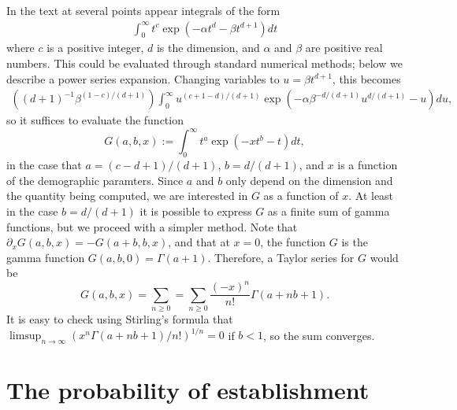 \documentclass{article}
\begin{document}
In the text at several points appear integrals of the form
\begin{align}
  \int_0^\infty t^c \exp \left( - \alpha t^d - \beta t^{d+1} \right) dt 
\end{align}
where $c$ is a positive integer, $d$ is the dimension, and $\alpha$ and $\beta$ are positive real numbers.
This could be evaluated through standard numerical methods; below we describe a power series expansion.
Changing variables to $u = \beta t^{d+1}$, this becomes
\begin{align}
    \left( (d+1)^{-1} \beta^{ (1-c)/(d+1) } \right) \int_0^\infty u^{(c+1-d)/(d+1)} \exp\left( - \alpha \beta^{-d/(d+1)} u^{d/(d+1)} - u \right) du ,
\end{align}
so it suffices to evaluate the function
\begin{equation}
    G(a,b,x) := \int_0^\infty  t^a \exp\left( -x t^b - t \right) dt ,
\end{equation}
in the case that $a=(c-d+1)/(d+1)$, $b=d/(d+1)$, and $x$ is a function of the demographic paramters.
Since $a$ and $b$ only depend on the dimension and the quantity being computed,
we are interested in $G$ as a function of $x$.
At least in the case $b=d/(d+1)$ it is possible to express $G$ as a finite sum of gamma functions,
but we proceed with a simpler method.
Note that $\partial_x G(a,b,x) = -G(a+b,b,x)$,
and that at $x=0$, the function $G$ is the gamma function $G(a,b,0) = \Gamma(a+1)$.
Therefore, a Taylor series for $G$ would be
\[
    G(a,b,x) = \sum_{n \ge 0} = \sum_{n \ge 0} \frac{(-x)^n}{n!} \Gamma(a+nb+1) .
\]
It is easy to check using Stirling's formula that $\limsup_{n \to \infty} ( x^n \Gamma(a+nb+1)/n! )^{1/n} = 0$
if $b<1$, so the sum converges.


\section{The probability of establishment}
\label{ss:prob_estab}
\end{document}
